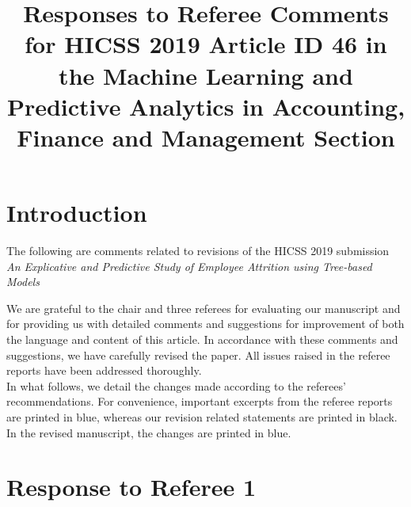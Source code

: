 \documentclass{amsart}[12pt]
\title{Responses to Referee Comments for HICSS 2019 Article ID 46 in the Machine Learning and 
Predictive Analytics in Accounting, Finance and Management Section}
\begin{document}
\maketitle

\section{Introduction}

The following are comments related to revisions of the HICSS 2019 submission \emph{An 
Explicative and Predictive Study of Employee Attrition using Tree-based Models} 

\indent
We are grateful to the chair and three referees for evaluating our
manuscript and for providing us with detailed comments and suggestions for improvement of both 
the language and content of this article. In
accordance with these comments and suggestions, we have carefully revised
the paper. All issues raised in the referee reports have been addressed thoroughly.\\
\indent In what follows, we detail the changes made according to the referees'
recommendations. For convenience, important excerpts from the referee reports are printed in blue,
whereas our revision related statements are
printed in black. In the revised manuscript, the changes are printed in blue.\\




\section{Response to Referee 1}
\end{document}
